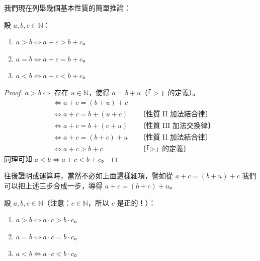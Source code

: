 我們現在列舉幾個基本性質的簡單推論：

\begin{prop}[次序推論 XI]\label{prop:nat_xi}
設 $a, b, c \in \mathbb{N}$：
\begin{enumerate}[(1)]
  \item $a > b \iff a+c > b+c$。
  \item $a = b \iff a+c = b+c$。
  \item $a < b \iff a+c < b+c$。
\end{enumerate}
\end{prop}

\begin{proof}
$a > b \iff$ 存在 $u \in \mathbb{N}$，使得 $a = b + u$（「$>$」的定義）。
\begin{align*}
  &\iff a+c = (b+u)+c \\
  &\iff a+c = b+(u+c) && \text{〔性質 II 加法結合律〕} \\
  &\iff a+c = b+(c+u) && \text{〔性質 III 加法交換律〕} \\
  &\iff a+c = (b+c)+u && \text{〔性質 II 加法結合律〕} \\
  &\iff a+c > b+c && \text{〔「$>$」的定義〕}
\end{align*}
同理可知 $a < b \iff a+c < b+c$。
\end{proof}

\begin{remark}
往後證明或運算時，當然不必如上面這樣細項，譬如從 $a+c = (b+u)+c$ 我們可以把上述三步合成一步，導得 $a+c = (b+c)+u$。
\end{remark}

\begin{prop}\label{prop:nat_xii}
設 $a, b, c \in \mathbb{N}$（注意：$c \in \mathbb{N}$，所以 $c$ 是正的！）：
\begin{enumerate}[(1)]
  \item $a > b \iff a \cdot c > b \cdot c$。
  \item $a = b \iff a \cdot c = b \cdot c$。
  \item $a < b \iff a \cdot c < b \cdot c$。
\end{enumerate}
\end{prop}

